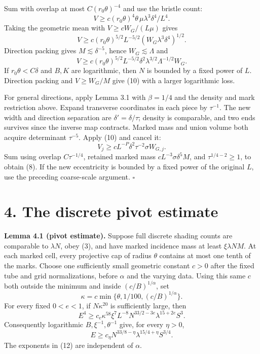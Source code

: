 \documentclass[
  11pt,
  a4paper,
]{article}
\begin{document}
Sum with overlap at most \(C(r_0\theta)^{-4}\) and use the bristle
count: \[
 V\ge c(r_0\theta)^4\theta\,\mu\lambda^3\delta^4/L^4.
\] Taking the geometric mean with \(V\ge cW_G/(L\mu)\) gives \[
 V\ge c(r_0\theta)^{5/2}L^{-5/2}
          (W_G\lambda^3\delta^4)^{1/2}.
\tag{9}\label{eq:9}
\] Direction packing gives \(M\lesssim\delta^{-5}\), hence
\(W_G\lesssim\Lambda\) and \[
 V\ge c(r_0\theta)^{5/2}L^{-5/2}
       \delta^2\lambda^{3/2}\Lambda^{-1/2}W_G.
\tag{10}\label{eq:10}
\] If \(r_0\theta<C\delta\) and \(B,K\) are logarithmic, then \(N\) is
bounded by a fixed power of \(L\). Direction packing and \(V\ge W_G/M\)
give (10) with a larger logarithmic loss.

For general directions, apply Lemma 3.1 with \(\beta=1/4\) and the
density and mark restriction above. Expand transverse coordinates in
each piece by \(\tau^{-1}\). The new width and direction separation are
\(\delta'=\delta/\tau\); density is comparable, and two ends survives
since the inverse map contracts. Marked mass and union volume both
acquire determinant \(\tau^{-5}\). Apply (10) and cancel it: \[
 V_j\ge cL^{-P}\delta^2\tau^{-2}\sigma W_{G,j}.
\] Sum using overlap \(C\tau^{-1/4}\), retained marked mass
\(cL^{-3}\sigma\delta^5M\), and \(\tau^{1/4-2}\ge1\), to obtain (8). If
the new eccentricity is bounded by a fixed power of the original \(L\),
use the preceding coarse-scale argument. \(\square\)

\hypertarget{the-discrete-pivot-estimate}{%
\section{4. The discrete pivot
estimate}\label{the-discrete-pivot-estimate}}

\textbf{Lemma 4.1 (pivot estimate).} Suppose full discrete shading
counts are comparable to \(\lambda N\), obey (3), and have marked
incidence mass at least \(\xi\lambda NM\). At each marked cell, every
projective cap of radius \(\theta\) contains at most one tenth of the
marks. Choose one sufficiently small geometric constant \(c>0\) after
the fixed tube and grid normalizations, before \(\alpha\) and the
varying data. Using this same \(c\) both outside the minimum and inside
\((c/B)^{1/\alpha}\), set \[
 \kappa=c\min\{\theta,1/100,(c/B)^{1/\alpha}\}.
\] For every fixed \(0<e<1\), if \(N\kappa^{20}\) is sufficiently large,
then \[
 E^4\ge c_e\kappa^{58}\xi^7L^{-8}
        N^{33/2-3e}\lambda^{15+2e}S^3.
\tag{11}\label{eq:11}
\] Consequently logarithmic \(B,\xi^{-1},\theta^{-1}\) give, for every
\(\eta>0\), \[
 E\ge c_\eta N^{33/8-\eta}
          \lambda^{15/4+\eta}S^{3/4}.
\tag{12}\label{eq:12}
\] The exponents in (12) are independent of \(\alpha\).
\end{document}
